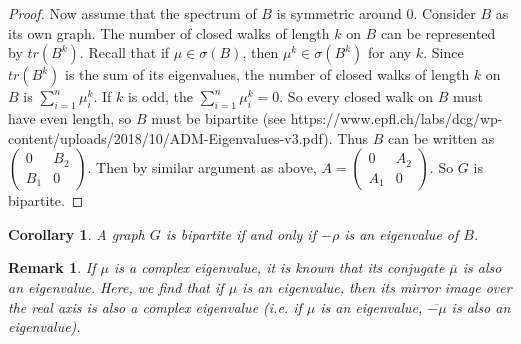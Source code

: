 \documentclass[a4paper]{article}
\newtheorem*{remark}{Remark}
\newtheorem{corollary}{Corollary}[theorem]
\begin{document}
\begin{proof}
Now assume that the spectrum of $B$ is symmetric around 0.
Consider $B$ as its own graph. The number of closed walks of length $k$ on $B$ can be represented by $tr(B^k)$.
Recall that if $\mu\in\sigma(B)$, then $\mu^k\in\sigma(B^k)$ for any $k$.
Since $tr(B^k)$ is the sum of its eigenvalues, the number of closed walks of length $k$ on $B$ is $\sum_{i=1}^n\mu_i^k$.
If $k$ is odd, the $\sum_{i=1}^n\mu_i^k=0$.
So every closed walk on $B$ must have even length, so $B$ must be bipartite (see https://www.epfl.ch/labs/dcg/wp-content/uploads/2018/10/ADM-Eigenvalues-v3.pdf).
Thus $B$ can be written as $\begin{pmatrix}0&B_2\\B_1&0\end{pmatrix}$. Then by similar argument as above, $A=\begin{pmatrix}0&A_2\\A_1&0\end{pmatrix}$. So $G$ is bipartite.
\end{proof}

\begin{corollary}
A graph $G$ is bipartite if and only if $-\rho$ is an eigenvalue of $B$.
\end{corollary}

\begin{remark}
If $\mu$ is a complex eigenvalue, it is known that its conjugate $\overline{\mu}$ is also an eigenvalue. Here, we find that if $\mu$ is an eigenvalue, then its mirror image over the real axis is also a complex eigenvalue (i.e. if $\mu$ is an eigenvalue, $\overline{-\mu}$ is also an eigenvalue).
\end{remark}
\end{document}
